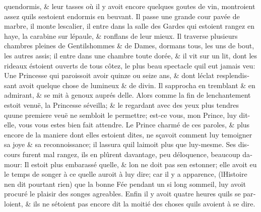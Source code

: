 \documentclass[14pt,a4paper]{memoir}
\begin{document}
\begin{otherlanguage}{french}
qu\textquotesingle endormis, \& leur tasses où il y avoit encore
quelques goutes de vin, montroient assez qu\textquotesingle ils
s\textquotesingle estoient endormis en beuvant. Il passe une grande cour
pavée de marbre, il monte l\textquotesingle escalier, il entre dans la
salle des Gardes qui estoient rangez en haye, la carabine sur
l\textquotesingle épaule, \& ronflans de leur mieux. Il traverse
plusieurs chambres pleines de Gentilshommes \& de Dames, dormans tous,
les uns de bout, les autres assis; il entre dans une chambre toute
dorée, \& il vit sur un lit, dont les rideaux éstoient ouverts de tous
côtez, le plus beau spectacle qu\textquotesingle il eut jamais veu: Une
Princesse qui paroissoit avoir quinze ou seize ans, \& dont
l\textquotesingle éclat resplendissant avoit quelque chose de lumineux
\& de divin. Il s\textquotesingle approcha en tremblant \& en admirant,
\& se mit à genoux auprés d\textquotesingle elle. Alors comme la fin de
l\textquotesingle enchantement estoit venuë, la Princesse
s\textquotesingle éveilla; \& le regardant avec des yeux plus tendres
qu\textquotesingle une premiere veuë ne sembloit le permettre; est-ce
vous, mon Prince, luy dit-elle, vous vous estes bien fait attendre. Le
Prince charmé de ces paroles, \& plus encore de la maniere dont elles
estoient dites, ne sçavoit comment luy temoigner sa joye \& sa
reconnoissance; il l\textquotesingle assura qu\textquotesingle il
l\textquotesingle aimoit plus que luy-mesme. Ses discours furent mal
rangez, ils en plûrent davantage, peu d\textquotesingle éloquence,
beaucoup d\textquotesingle amour: Il estoit plus embarassé
qu\textquotesingle elle, \& l\textquotesingle on ne doit pas
s\textquotesingle en estonner; elle avoit eu le temps de songer à ce
qu\textquotesingle elle auroit à luy dire; car il y a apparence,
(l\textquotesingle Histoire n\textquotesingle en dit pourtant rien) que
la bonne Fée pendant un si long sommeil, luy avoit procuré le plaisir
des songes agreables. Enfin il y avoit quatre heures
qu\textquotesingle ils se parloient, \& ils ne s\textquotesingle étoient
pas encore dit la moitié des choses qu\textquotesingle ils avoient à se
dire.


\end{otherlanguage}
\end{document}
